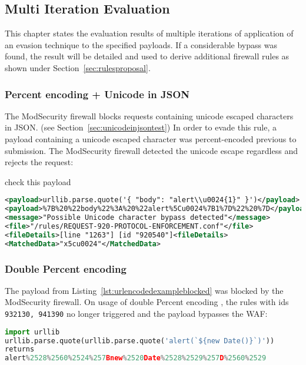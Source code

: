 \subsection{Multi Iteration Evaluation}
\label{sec:multiiteration}
This chapter states the evaluation results of multiple iterations of application of an evasion technique to the specified payloads. If a considerable bypass was found, the result will be detailed and used to derive additional firewall rules as shown under Section~\ref{sec:rulesproposal}.


\subsubsection{Percent encoding + Unicode in JSON}
The ModSecurity firewall blocks requests containing unicode escaped characters in JSON. (see Section~\ref{sec:unicodeinjsontest})
In order to evade this rule, a payload containing a unicode escaped character was percent-encoded previous to submission.
The ModSecurity firewall detected the unicode escape regardless and rejects the request:

{\color{red} check this payload}
\begin{lstlisting}[style=ruleStyle, language=XML, caption=unicode escape in json with additional percent encoding, label={lst:jsonunicodeurlenctest}]
<payload>urllib.parse.quote('{ "body": "alert\\u0024{1}" }')</payload>
<payload>%7B%20%22body%22%3A%20%22alert%5Cu0024%7B1%7D%22%20%7D</payload>
<message>"Possible Unicode character bypass detected"</message>
<file>"/rules/REQUEST-920-PROTOCOL-ENFORCEMENT.conf"</file>
<fileDetails>[line "1263"] [id "920540"]<fileDetails>
<MatchedData>"x5cu0024"</MatchedData>
\end{lstlisting}


\subsubsection{Double Percent encoding}
\label{sec:doublepercenc}
The payload from Listing~\ref{lst:urlencodedexampleblocked} was blocked by the ModSecurity firewall.
On usage of double Percent encoding , the rules with ids \verb|932130, 941390| no longer triggered and the payload bypasses the WAF:

\begin{lstlisting}[style=basicStyle, caption=url encoded example pass, label={lst:doublepercentencoding}, escapeinside=\^\^, language=Python]
import urllib
urllib.parse.quote(urllib.parse.quote('alert(`${new Date()}`)'))
returns
alert%2528%2560%2524%257Bnew%2520Date%2528%2529%257D%2560%2529
\end{lstlisting}

